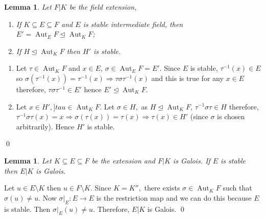 \documentclass[11pt]{amsart}
\newtheorem{lemma}[theorem]{Lemma}%
\DeclareMathOperator{\aut}{\text{Aut}}
\begin{document}
\begin{lemma}
Let $F|K$ be the field extension, \begin{enumerate}
\item If $K\subseteq E\subseteq F$ and $E$ is stable intermediate field, then $E'=\aut_EF\unlhd \aut_KF$;
\item If $H\unlhd \aut_KF$ then $H'$ is stable.
\end{enumerate}
\end{lemma}
\proof \begin{enumerate}
\item Let $\tau\in \aut_KF$ and $x\in E$, $\sigma\in \aut_EF=E'.$ Since $E$ is stable, $\tau^{-1}(x)\in E$ so $\sigma(\tau^{-1}(x))=\tau^{-1}(x) \Rightarrow \tau\sigma\tau^{-1}(x)$ and this is true for any $x\in E$ therefore, $\tau\sigma\tau^{-1}\in E'$ hence $E'\unlhd \aut_KF.$
\item Let $x\in H',]tau\in \aut_KF$. Let $\sigma\in H,$ as $H\unlhd \aut_KF$, $\tau^{-1}\sigma\tau\in H$ therefore, $\tau^{-1}\sigma\tau(x)=x \Rightarrow \sigma(\tau(x))=\tau(x) \Rightarrow \tau(x)\in H'$ (since $\sigma$ is chosen arbitrarily). Hence $H'$ is stable.
\end{enumerate}
\qed

\begin{lemma}
Let $K\subseteq E\subseteq F$ be the extension and $F|K$ is Galois. If $E$ is stable then $E|K$ is Galois.
\end{lemma}
\proof Let $u\in E\setminus K$ then $u\in F\setminus K.$ Since $K=K'',$ there exists $\sigma\in\aut_KF$ such that $\sigma(u)\neq u.$ Now $\sigma|_E:E\to E$ is the restriction map and we can do this because $E$ is stable. Then $\sigma|_E(u)\neq u$. Therefore, $E|K$ is Galois. \qed
\end{document}
